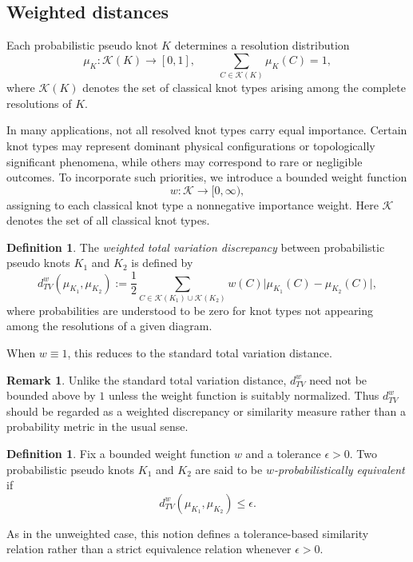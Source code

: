 \documentclass[a4paper, reqno, 12pt]{amsart}
\theoremstyle{plain}
\theoremstyle{definition}
\newtheorem{definition}[theorem]{Definition}
\newtheorem{remark}[theorem]{Remark}
\begin{document}
\subsection{Weighted distances}

Each probabilistic pseudo knot \(K\) determines a resolution distribution
\[
\mu_K:\mathcal K(K)\to[0,1],
\qquad
\sum_{C\in\mathcal K(K)}\mu_K(C)=1,
\]
where \(\mathcal K(K)\) denotes the set of classical knot types arising among the complete resolutions of \(K\).

In many applications, not all resolved knot types carry equal importance. Certain knot types may represent dominant physical configurations or topologically significant phenomena, while others may correspond to rare or negligible outcomes. To incorporate such priorities, we introduce a bounded weight function
\[
w:\mathcal K \to [0,\infty),
\]
assigning to each classical knot type a nonnegative importance weight. Here \(\mathcal K\) denotes the set of all classical knot types.

\begin{definition}\rm
The \emph{weighted total variation discrepancy} between probabilistic pseudo knots \(K_1\) and \(K_2\) is defined by
\[
d_{TV}^{w}(\mu_{K_1},\mu_{K_2})
:=
\frac12
\sum_{C\in\mathcal K(K_1)\cup\mathcal K(K_2)}
w(C)
\big|
\mu_{K_1}(C)-\mu_{K_2}(C)
\big|,
\]
where probabilities are understood to be zero for knot types not appearing among the resolutions of a given diagram.

When \(w\equiv 1\), this reduces to the standard total variation distance.
\end{definition}

\begin{remark}\rm
Unlike the standard total variation distance, \(d_{TV}^{w}\) need not be bounded above by \(1\) unless the weight function is suitably normalized. Thus \(d_{TV}^{w}\) should be regarded as a weighted discrepancy or similarity measure rather than a probability metric in the usual sense.
\end{remark}

\begin{definition}
Fix a bounded weight function \(w\) and a tolerance \(\epsilon>0\). Two probabilistic pseudo knots \(K_1\) and \(K_2\) are said to be \emph{\(w\)-probabilistically equivalent} if
\[
d_{TV}^{w}(\mu_{K_1},\mu_{K_2})\le \epsilon .
\]
\end{definition}

As in the unweighted case, this notion defines a tolerance-based similarity relation rather than a strict equivalence relation whenever \(\epsilon>0\).
\end{document}

